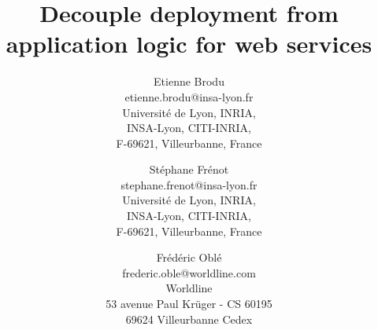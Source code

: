 \documentclass[10pt]{article}
\begin{document}
\title{%
{Decouple deployment from application logic for web services}%
}

\author{
  Etienne Brodu\\
  \textsf{\normalsize{etienne.brodu@insa-lyon.fr}}\\
  \textsf{\small{Université de Lyon, INRIA,}}\\
  \textsf{\small{INSA-Lyon, CITI-INRIA,}}\\
  \textsf{\small{F-69621, Villeurbanne, France}}
  \and
  Stéphane Frénot\\
  \textsf{\normalsize{stephane.frenot@insa-lyon.fr}}\\
  \textsf{\small{Université de Lyon, INRIA,}}\\
  \textsf{\small{INSA-Lyon, CITI-INRIA,}}\\
  \textsf{\small{F-69621, Villeurbanne, France}}
  \and
  Frédéric Oblé\\
  \textsf{\normalsize{frederic.oble@worldline.com}}\\
  \textsf{\small{Worldline}}\\
  \textsf{\small{53 avenue Paul Krüger - CS 60195}}\\
  \textsf{\small{69624 Villeurbanne Cedex}}
}

\date{}


\maketitle

% 




\printbibliography[]
\end{document}
